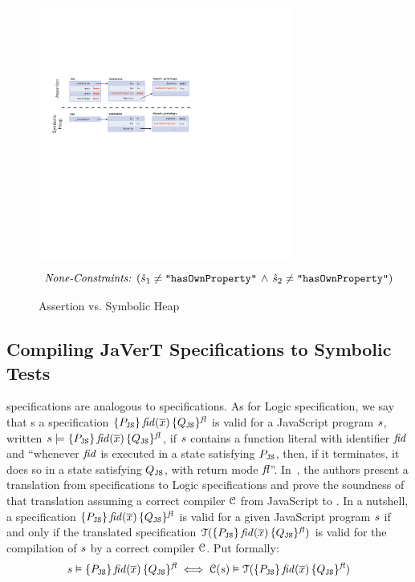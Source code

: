 \begin{figure}[t!]
\includegraphics[width=0.75\textwidth]{figures/symbolicvsass.pdf}
{\small $$
\text{\emph{None-Constraints: }} (\hat{s}_1 \neq \texttt{"hasOwnProperty"} \, \wedge \, \hat{s}_2 \neq \texttt{"hasOwnProperty"})
$$}
\vspace{-25pt}
\caption{Assertion vs. Symbolic Heap}\label{fig:symb:state:versus:assertion}
\end{figure}


\subsection{Compiling JaVerT Specifications to Symbolic Tests} 
\label{specs:example}

 \javert specifications are analogous to \jsil specifications. 
As for \jsil Logic specification, we say that s a \javert specification $\{ P_{\mathtt{JS}} \} \, \mathit{fid}(\overline{x}) \, \{ Q_{\mathtt{JS}} \}^{\mathit{fl}}$
is valid for a JavaScript program $s$, written $s \models \{ P_{\mathtt{JS}} \} \, \mathit{fid}(\overline{x}) \, \{ Q_{\mathtt{JS}} \}^{\mathit{fl}}$, 
if $s$ contains a function literal with identifier $\mathit{fid}$ and ``whenever $\mathit{fid}$ is executed in a state satisfying $P_{\mathtt{JS}}$, then, 
if it terminates, it does so in a state satisfying $Q_{\mathtt{JS}}$, with return mode $\mathit{fl}$''.
In~\cite{javert}, the authors present 
a translation from \javert specifications to \jsil Logic specifications and prove the soundness 
of that translation assuming a correct compiler ${\mathcal C}$ from JavaScript to \jsil.
In a nutshell, a \javert  specification $\{ P_{\mathtt{JS}} \} \, \mathit{fid}(\overline{x}) \, \{ Q_{\mathtt{JS}} \}^{\mathit{fl}}$
is valid for a given JavaScript program $s$ if and only if the translated specification 
$\mathcal{T}(\{ P_{\mathtt{JS}} \} \, \mathit{fid}(\overline{x}) \, \{ Q_{\mathtt{JS}} \}^{\mathit{fl}})$ is valid for the compilation 
of $s$ by a correct compiler ${\mathcal C}$. Put formally:  
\begin{equation}
   s \vDash  \{ P_{\mathtt{JS}} \} \, \mathit{fid}(\overline{x}) \, \{ Q_{\mathtt{JS}} \}^{\mathit{fl}} 
      \iff
           {\mathcal C}(s) \vDash \mathcal{T}(\{ P_{\mathtt{JS}} \} \, \mathit{fid}(\overline{x}) \, \{ Q_{\mathtt{JS}} \}^{\mathit{fl}}) 
\end{equation}

